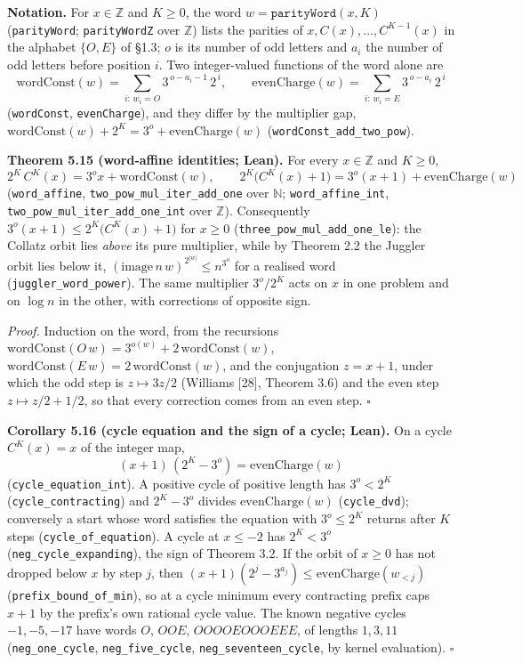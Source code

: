 \documentclass[12pt]{article}
\begin{document}
\textbf{Notation.} For \(x\in\mathbb Z\) and \(K\ge 0\), the word
\(w=\mathtt{parityWord}(x,K)\) (\texttt{\nolinkurl{parityWord}};
\texttt{\nolinkurl{parityWordZ}} over \(\mathbb Z\)) lists the parities
of \(x,C(x),\dots,C^{K-1}(x)\) in the alphabet \(\{O,E\}\) of §1.3;
\(o\) is its number of odd letters and \(a_i\) the number of odd letters
before position \(i\). Two integer-valued functions of the word alone
are \[
\mathrm{wordConst}(w)=\sum_{i:\,w_i=O}3^{\,o-a_i-1}\,2^{\,i},\qquad
\mathrm{evenCharge}(w)=\sum_{i:\,w_i=E}3^{\,o-a_i}\,2^{\,i}
\] (\texttt{\nolinkurl{wordConst}}, \texttt{\nolinkurl{evenCharge}}),
and they differ by the multiplier gap,
\(\mathrm{wordConst}(w)+2^K=3^o+\mathrm{evenCharge}(w)\)
(\texttt{\nolinkurl{wordConst_add_two_pow}}).

\textbf{Theorem 5.15 (word-affine identities; Lean).} For every
\(x\in\mathbb Z\) and \(K\ge0\), \[
2^K\,C^K(x)=3^{o}x+\mathrm{wordConst}(w),\qquad
2^K\bigl(C^K(x)+1\bigr)=3^{o}(x+1)+\mathrm{evenCharge}(w)
\] (\texttt{\nolinkurl{word_affine}},
\texttt{\nolinkurl{two_pow_mul_iter_add_one}} over \(\mathbb N\);
\texttt{\nolinkurl{word_affine_int}},
\texttt{\nolinkurl{two_pow_mul_iter_add_one_int}} over \(\mathbb Z\)).
Consequently \(3^o(x+1)\le 2^K\bigl(C^K(x)+1\bigr)\) for \(x\ge 0\)
(\texttt{\nolinkurl{three_pow_mul_add_one_le}}): the Collatz orbit lies
\emph{above} its pure multiplier, while by Theorem 2.2 the Juggler orbit
lies below it, \((\mathrm{image}\,n\,w)^{2^{|w|}}\le n^{3^{o}}\) for a
realised word (\texttt{\nolinkurl{juggler_word_power}}). The same
multiplier \(3^o/2^K\) acts on \(x\) in one problem and on \(\log n\) in
the other, with corrections of opposite sign.

\emph{Proof.} Induction on the word, from the recursions
\(\mathrm{wordConst}(O\,w)=3^{o(w)}+2\,\mathrm{wordConst}(w)\),
\(\mathrm{wordConst}(E\,w)=2\,\mathrm{wordConst}(w)\), and the
conjugation \(z=x+1\), under which the odd step is \(z\mapsto 3z/2\)
(Williams {[}28{]}, Theorem 3.6) and the even step \(z\mapsto z/2+1/2\),
so that every correction comes from an even step. \(\square\)

\textbf{Corollary 5.16 (cycle equation and the sign of a cycle; Lean).}
On a cycle \(C^K(x)=x\) of the integer map, \[
(x+1)\,(2^K-3^o)=\mathrm{evenCharge}(w)
\] (\texttt{\nolinkurl{cycle_equation_int}}). A positive cycle of
positive length has \(3^o<2^K\) (\texttt{\nolinkurl{cycle_contracting}})
and \(2^K-3^o\) divides \(\mathrm{evenCharge}(w)\)
(\texttt{\nolinkurl{cycle_dvd}}); conversely a start whose word
satisfies the equation with \(3^o\le2^K\) returns after \(K\) steps
(\texttt{\nolinkurl{cycle_of_equation}}). A cycle at \(x\le-2\) has
\(2^K<3^o\) (\texttt{\nolinkurl{neg_cycle_expanding}}), the sign of
Theorem 3.2. If the orbit of \(x\ge0\) has not dropped below \(x\) by
step \(j\), then \((x+1)(2^j-3^{a_j})\le\mathrm{evenCharge}(w_{<j})\)
(\texttt{\nolinkurl{prefix_bound_of_min}}), so at a cycle minimum every
contracting prefix caps \(x+1\) by the prefix's own rational cycle
value. The known negative cycles \(-1,-5,-17\) have words \(O\),
\(OOE\), \(OOOOEOOOEEE\), of lengths \(1,3,11\)
(\texttt{\nolinkurl{neg_one_cycle}},
\texttt{\nolinkurl{neg_five_cycle}},
\texttt{\nolinkurl{neg_seventeen_cycle}}, by kernel evaluation).
\(\square\)
\end{document}
